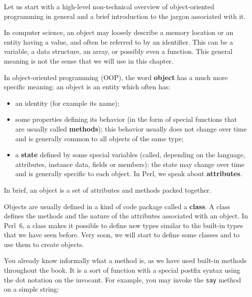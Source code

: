 Let us start with a high-level non-technical overview 
of object-oriented programming in general and a brief 
introduction to the jargon associated with it.

In computer science, an object may loosely describe a memory 
location or an entity having a value, and often be referred to 
by an identifier. This can be a variable, a data structure, 
an array, or possibly even a function. This general meaning 
is not the sense that we will use in this chapter.

In object-oriented programming (OOP), the word {\bf object} 
has a much more specific meaning: an object is an entity 
which often has:
\begin{itemize}

\item an identity (for example its name);

\item some properties defining its behavior (in the form of 
special functions that are usually called {\bf methods}); this 
behavior usually does not change over time and is generally 
common to all objects of the same type;

\item a {\bf state} defined by some special variables (called, 
depending on the language, attributes, instance data, fields 
or members); the state may change over time and is generally 
specific to each object. In Perl, we speak about 
{\bf attributes}.
\end{itemize}

In brief, an object is a set of attributes and methods packed 
together.

Objects are usually defined in a kind of code package called 
a {\bf class}. A class defines the methods and the nature of 
the attributes associated with an object. In Perl~6, a class makes it 
possible to define new types similar to the built-in types 
that we have seen before. Very soon, we will start to define 
some classes and to use them to create objects.

You already know informally what a method is, as we have 
used built-in methods throughout the book. It is a sort of 
function with a special postfix syntax using the dot notation 
on the invocant. For example, you may invoke the {\tt say} 
method on a simple string:

